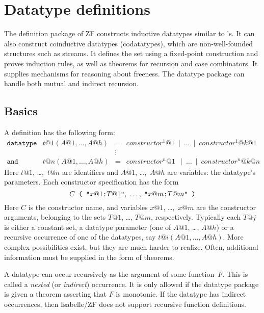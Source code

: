 

\section{Datatype definitions}
\label{sec:ZF:datatype}

The  definition package of ZF constructs inductive datatypes
similar to \ML's.  It can also construct coinductive datatypes
(codatatypes), which are non-well-founded structures such as streams.  It
defines the set using a fixed-point construction and proves induction rules,
as well as theorems for recursion and case combinators.  It supplies
mechanisms for reasoning about freeness.  The datatype package can handle both
mutual and indirect recursion.


\subsection{Basics}
\label{subsec:datatype:basics}

A  definition has the following form:
\[
\begin{array}{llcl}
\mathtt{datatype} & t@1(A@1,\ldots,A@h) & = &
  constructor^1@1 ~\mid~ \ldots ~\mid~ constructor^1@{k@1} \\
 & & \vdots \\
\mathtt{and} & t@n(A@1,\ldots,A@h) & = &
  constructor^n@1~ ~\mid~ \ldots ~\mid~ constructor^n@{k@n}
\end{array}
\]
Here $t@1$, \ldots,~$t@n$ are identifiers and $A@1$, \ldots,~$A@h$ are
variables: the datatype's parameters.  Each constructor specification has the
form \dquotesoff
\[ C \hbox{\tt~( } \hbox{\tt"} x@1 \hbox{\tt:} T@1 \hbox{\tt"},\;
                   \ldots,\;
                   \hbox{\tt"} x@m \hbox{\tt:} T@m \hbox{\tt"}
     \hbox{\tt~)}
\]
Here $C$ is the constructor name, and variables $x@1$, \ldots,~$x@m$ are the
constructor arguments, belonging to the sets $T@1$, \ldots, $T@m$,
respectively.  Typically each $T@j$ is either a constant set, a datatype
parameter (one of $A@1$, \ldots, $A@h$) or a recursive occurrence of one of
the datatypes, say $t@i(A@1,\ldots,A@h)$.  More complex possibilities exist,
but they are much harder to realize.  Often, additional information must be
supplied in the form of theorems.

A datatype can occur recursively as the argument of some function~$F$.  This
is called a {\em nested} (or \emph{indirect}) occurrence.  It is only allowed
if the datatype package is given a theorem asserting that $F$ is monotonic.
If the datatype has indirect occurrences, then Isabelle/ZF does not support
recursive function definitions.

